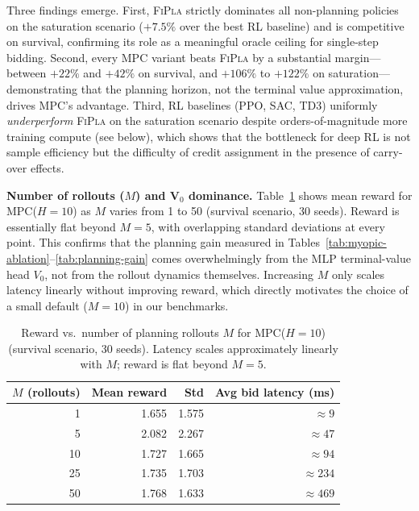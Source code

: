 \documentclass[11pt]{article}
\begin{document}
Three findings emerge.  First, \textsc{FiPla} strictly dominates all non-planning policies
on the saturation scenario ($+7.5\%$ over the best RL baseline) and is competitive on
survival, confirming its role as a meaningful oracle ceiling for single-step bidding.
Second, every MPC variant beats \textsc{FiPla} by a substantial margin---between $+22\%$
and $+42\%$ on survival, and $+106\%$ to $+122\%$ on saturation---demonstrating that the
planning horizon, not the terminal value approximation, drives MPC's advantage.  Third,
RL baselines (PPO, SAC, TD3) uniformly \emph{underperform} \textsc{FiPla} on the
saturation scenario despite orders-of-magnitude more training compute (see below), which
shows that the bottleneck for deep RL is not sample efficiency but the difficulty of
credit assignment in the presence of carry-over effects.

\medskip
\textbf{Number of rollouts ($M$) and V$_0$ dominance.}\quad
Table~\ref{tab:nrollouts} shows mean reward for \textsc{MPC}($H{=}10$) as $M$ varies
from 1 to 50 (survival scenario, 30 seeds).  Reward is essentially flat beyond $M{=}5$,
with overlapping standard deviations at every point.  This confirms that the planning
gain measured in Tables~\ref{tab:myopic-ablation}--\ref{tab:planning-gain} comes
overwhelmingly from the MLP terminal-value head $V_0$, not from the rollout dynamics
themselves.  Increasing $M$ only scales latency linearly without improving reward,
which directly motivates the choice of a small default ($M{=}10$) in our benchmarks.

\begin{table}[h!]
\centering
\caption{Reward vs.\ number of planning rollouts $M$ for \textsc{MPC}($H{=}10$)
         (survival scenario, 30 seeds).  Latency scales approximately linearly with $M$;
         reward is flat beyond $M{=}5$.}
\label{tab:nrollouts}
\begin{tabular}{rrrr}
\toprule
$M$ (rollouts) & Mean reward & Std & Avg bid latency (ms) \\
\midrule
1  & 1.655 & 1.575 & $\approx 9$ \\
5  & 2.082 & 2.267 & $\approx 47$ \\
10 & 1.727 & 1.665 & $\approx 94$ \\
25 & 1.735 & 1.703 & $\approx 234$ \\
50 & 1.768 & 1.633 & $\approx 469$ \\
\bottomrule
\end{tabular}
\end{table}
\end{document}
